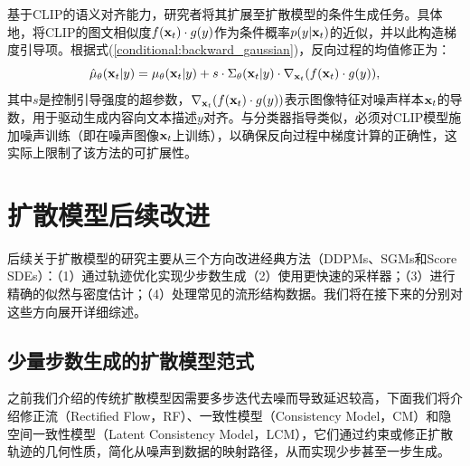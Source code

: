 \documentclass[11pt,a4paper,UTF8]{ctexart}
\begin{document}
基于CLIP的语义对齐能力，研究者将其扩展至扩散模型的条件生成任务\cite{clip-guide-1,Patashnik_2021_ICCV,gal2022StyleGAN}。具体地，将CLIP的图文相似度$f(\mathbf{x}_t)\cdot g(y)$作为条件概率$p(y|\mathbf{x}_t)$的近似，并以此构造梯度引导项。根据式(\ref{conditional:backward_gaussian})，反向过程的均值修正为：
\begin{equation}
\hat{\mu}_{\theta}(\mathbf{x}_t|y)=\mu_{\theta}(\mathbf{x}_t|y) + s\cdot\Sigma_\theta(\mathbf{x}_t|y)\cdot\nabla_{\mathbf{x}_t}(f(\mathbf{x}_t)\cdot g(y)),
\label{conditional_clip_guided}
\end{equation}
其中$s$是控制引导强度的超参数，$\nabla_{\mathbf{x}_t}(f(\mathbf{x}_t)\cdot g(y))$表示图像特征对噪声样本$\mathbf{x}_t$的导数，用于驱动生成内容向文本描述$y$对齐。与分类器指导类似，必须对CLIP模型施加噪声训练（即在噪声图像$\mathbf{x}_t$上训练），以确保反向过程中梯度计算的正确性，这实际上限制了该方法的可扩展性。


\section{扩散模型后续改进}

后续关于扩散模型的研究主要从三个方向改进经典方法（DDPMs、SGMs和Score SDEs）：（1）通过轨迹优化实现少步数生成（2）使用更快速的采样器；（3）进行精确的似然与密度估计；（4）处理常见的流形结构数据。我们将在接下来的分别对这些方向展开详细综述。

\subsection{少量步数生成的扩散模型范式}
\label{sec:rf_cm_lcm}

之前我们介绍的传统扩散模型因需要多步迭代去噪而导致延迟较高，下面我们将介绍修正流（Rectified Flow，RF）\cite{liu2022flow}、一致性模型（Consistency Model，CM）\cite{pmlr-v202-song23a}和隐空间一致性模型（Latent Consistency Model，LCM）\cite{luo2023latent}，它们通过约束或修正扩散轨迹的几何性质，简化从噪声到数据的映射路径，从而实现少步甚至一步生成。
\end{document}
